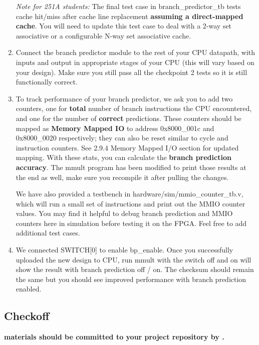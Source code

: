 \begin{enumerate}
  \textit{Note for 251A students:} The final test case in branch\_predictor\_tb tests cache hit/miss after cache line replacement \textbf{assuming a direct-mapped cache}. You will need to update this test case to deal with a 2-way set associative or a configurable N-way set associative cache.
  \item Connect the branch predictor module to the rest of your CPU datapath, with inputs and output in appropriate stages of your CPU (this will vary based on your design). Make sure you still pass all the checkpoint 2 tests so it is still functionally correct. 
  \item To track performance of your branch predictor, we ask you to add two counters, one for \textbf{total} number of branch instructions the CPU encountered, and one for the number of \textbf{correct} predictions. These counters should be mapped as \textbf{Memory Mapped IO} to address 0x8000\_001c and 0x8000\_0020 respectively; they can also be reset similar to cycle and instruction counters. See 2.9.4 Memory Mapped I/O section for updated mapping.  With these stats, you can calculate the \textbf{branch prediction accuracy}. The mmult program has been modified to print those results at the end as well, make sure you recompile it after pulling the changes. 

  We have also provided a testbench in hardware/sim/mmio\_counter\_tb.v, which will run a small set of instructions and print out the MMIO counter values. You may find it helpful to debug branch prediction and MMIO counters here in simulation before testing it on the FPGA. Feel free to add additional test cases.
  \item We connected SWITCH[0] to enable bp\_enable. Once you successfully uploaded the new design to CPU, run mmult with the switch off and on will show the result with branch prediction off / on. The checksum should remain the same but you should see improved performance with branch prediction enabled.
  
\end{enumerate}

\subsection{Checkoff}
\textbf{\branchPredictorTaskName \space materials should be committed to your project repository by \branchPredictorDueDate.}

